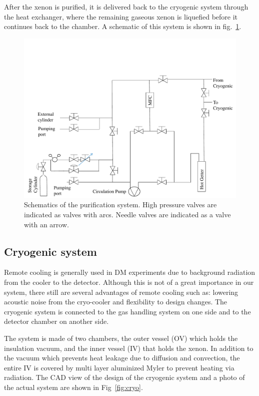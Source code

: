After the xenon is purified, it is delivered back to the cryogenic system 
through the heat exchanger, where the remaining gaseous xenon is 
liquefied before it continues back to the chamber. A schematic of this 
system is shown in fig.~\ref{fig:gasSchematic}.


\begin{figure}[h]
\centerline{\includegraphics[width=0.75\linewidth]{GasSchematics.pdf}}
\caption{Schematics of the purification system. High pressure valves are indicated as 
valves with arcs. Needle valves are indicated as 
a valve with an arrow.}
\label{fig:gasSchematic}
\end{figure}

\subsection{Cryogenic system}
\label{subsec:cryo}

Remote cooling is generally used in DM experiments due to background radiation
from the cooler to the detector. Although this is not of a great 
importance in our system, there still are several advantages of remote 
cooling such as: lowering acoustic noise from the cryo-cooler and 
flexibility to design changes. The cryogenic system is connected to the gas handling system on one side and to the detector chamber on another side. 

The system is made of two chambers, the outer vessel (OV) which holds 
the insulation vacuum, and the inner vessel (IV) that holds the xenon. In addition to the vacuum which prevents heat leakage due to diffusion and convection, the entire IV is covered by multi layer aluminized Myler to prevent heating via radiation. The CAD view of 
the design of the cryogenic system and a photo of the actual system are shown in Fig~\ref{fig:cryo}. 

